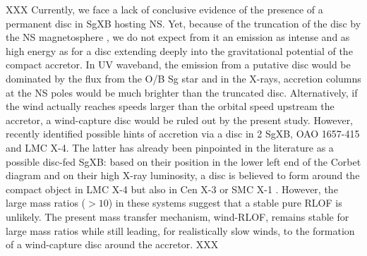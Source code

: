 \documentclass{aa}
\makeatletter
\newcommand{\sgx}{SgXB\xspace}
\newcommand*{\ns}{NS\@\xspace}
\makeatother
\begin{document}
XXX Currently, we face a lack of conclusive evidence of the presence of a permanent disc in \sgx hosting \ns \citep{Bozzo2008,Shakura2012,Romano2015,Hu2017}. Yet, because of the truncation of the disc by the \ns magnetosphere \citep{Ghosh1978}, we do not expect from it an emission as intense and as high energy as for a disc extending deeply into the gravitational potential of the compact accretor. In UV waveband, the emission from a putative disc would be dominated by the flux from the O/B Sg star and in the X-rays, accretion columns at the \ns poles would be much brighter than the truncated disc. Alternatively, if the wind actually reaches speeds larger than the orbital speed upstream the accretor, a wind-capture disc would be ruled out by the present study. However, \cite{Taani2018} recently identified possible hints of accretion via a disc in 2 \sgx, OAO 1657-415 and LMC X-4. The latter has already been pinpointed in the literature as a possible disc-fed \sgx : based on their position in the lower left end of the Corbet diagram \citep{Corbet1984} and on their high X-ray luminosity, a disc is believed to form around the compact object in LMC X-4 but also in Cen X-3 or SMC X-1 \citep{Falanga2015}. However, the large mass ratios ($>10$) in these systems suggest that a stable pure RLOF is unlikely. The present mass transfer mechanism, wind-RLOF, remains stable for large mass ratios while still leading, for realistically slow winds, to the formation of a wind-capture disc around the accretor. XXX
\end{document}
